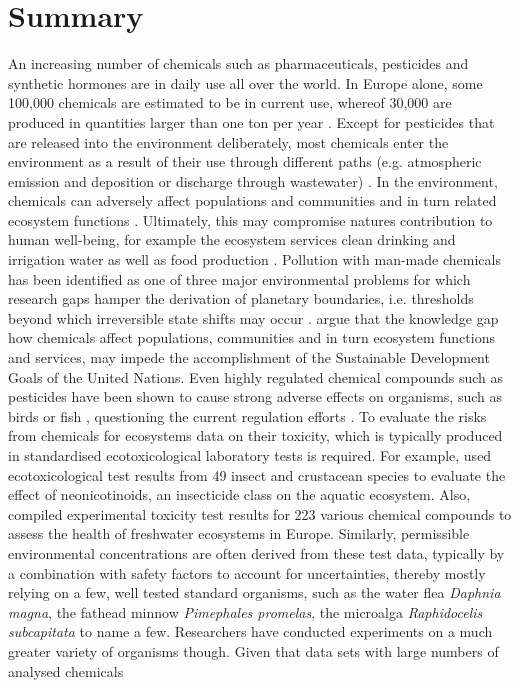 \section{Summary}
An increasing number of chemicals such as pharmaceuticals, pesticides and synthetic hormones are in daily use all over the world. In Europe alone, some 100,000 chemicals are estimated to be in current use, whereof 30,000 are produced in quantities larger than one ton per year \citep{breithaupt_costs_2006}. Except for pesticides that are released into the environment deliberately, most chemicals enter the environment as a result of their use through different paths (e.g. atmospheric emission and deposition or discharge through wastewater) \citep{schwarzenbach_challenge_2006}. In the environment, chemicals can adversely affect populations and communities and in turn related ecosystem functions \citep{rhind_anthropogenic_2009, clements_community_2009, hallmann_declines_2014, barracaracciolo_pharmaceuticals_2015, johnston_review_2015, hallmann_more_2017, sanchez-bayo_worldwide_2019}. Ultimately, this may compromise natures contribution to human well-being, for example the ecosystem services clean drinking and irrigation water as well as food production \citep{peters_review_2013, vandersluijs_neonicotinoids_2013, barracaracciolo_pharmaceuticals_2015, yamamuro_neonicotinoids_2019}. Pollution with man-made chemicals has been identified as one of three major environmental problems for which research gaps hamper the derivation of planetary boundaries, i.e. thresholds beyond which irreversible state shifts may occur \citep{steffen_anthropocene_2007, steffen_planetary_2015}. \citet{bernhardt_synthetic_2017} argue that the knowledge gap how chemicals affect populations, communities and in turn ecosystem functions and services, may impede the accomplishment of the Sustainable Development Goals of the United Nations. Even highly regulated chemical compounds such as pesticides have been shown to cause strong adverse effects on organisms, such as birds \citep{hallmann_declines_2014} or fish \citep{yamamuro_neonicotinoids_2019}, questioning the current regulation efforts \citep{schafer_future_2019}. To evaluate the risks from chemicals for ecosystems data on their toxicity, which is typically produced in standardised ecotoxicological laboratory tests is required. For example, \citet{morrissey_neonicotinoid_2015} used ecotoxicological test results from 49 insect and crustacean species to evaluate the effect of neonicotinoids, an insecticide class on the aquatic ecosystem. Also, \citet{malaj_organic_2014} compiled experimental toxicity test results for 223 various chemical compounds to assess the health of freshwater ecosystems in Europe. Similarly, permissible environmental concentrations are often derived from these test data, typically by a combination with safety factors to account for uncertainties, thereby mostly relying on a few, well tested standard organisms, such as the water flea \textit{Daphnia magna}, the fathead minnow \textit{Pimephales promelas}, the microalga \textit{Raphidocelis subcapitata} to name a few. Researchers have conducted experiments on a much greater variety of organisms though. Given that data sets with large numbers of analysed chemicals 